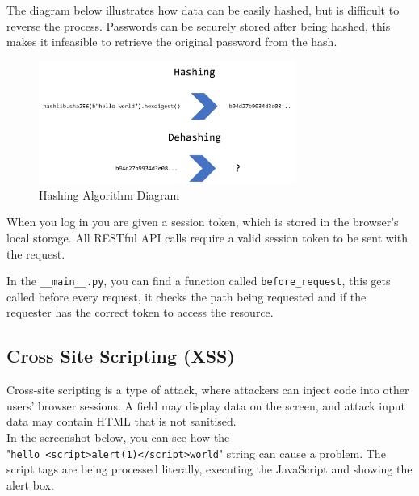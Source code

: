 The diagram below illustrates how data can be easily
hashed, but is difficult to reverse the process.
Passwords can be securely stored after being hashed,
this makes it infeasible to retrieve the original password from the hash.

\begin{figure}[h!]
    \centering
    \label{image:hashingDiagram}
    \includegraphics[width=0.75\textwidth]{images/diagrams/hashing}
    \caption{Hashing Algorithm Diagram}
\end{figure}

When you log in you are given a session token,
which is stored in the browser's local storage.
All RESTful API calls require a valid session token to be sent with the request.

In the \texttt{\_\_main\_\_.py}, you can find a function
called \texttt{before\_request},
this gets called before every request, it checks the path being requested
and if the requester has the correct token to access the resource.

\subsection{Cross Site Scripting (XSS)}
Cross-site scripting is a type of attack,
where attackers can inject code into other users' browser sessions. \cite{XSS}
A field may display data on the screen,
and attack input data may contain HTML
that is not sanitised. \\

In the screenshot below, you can see how the \\
"\texttt{hello <script>alert(1)</script>world}" string can cause a problem.
The script tags are being processed literally,
executing the JavaScript and showing the alert box.

